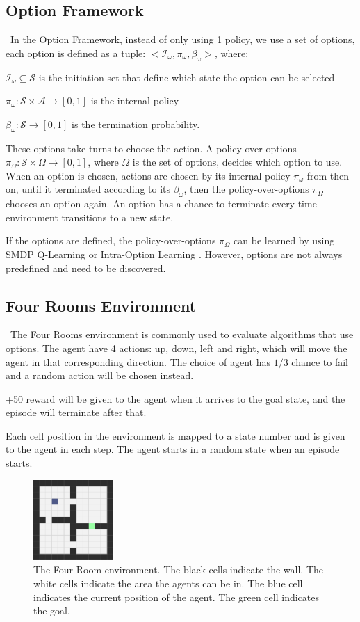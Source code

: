 \documentclass{article}
\begin{document}
	\subsection*{Option Framework}
	\qquad \ In the Option Framework\cite{SUTTON1999181}, instead of only using 1 policy, we use a set of options, each option is defined as a tuple: $<\mathcal{I}_\omega,\pi_\omega,\beta_\omega>$, where:
	
	\qquad $\mathcal{I}_\omega \subseteq \mathcal{S}$ is the initiation set that define which state the option can be selected
	
	\qquad $\pi_\omega : \mathcal{S} \times \mathcal{A} \rightarrow [0,1]$ is the internal policy
	
	\qquad $\beta_\omega:\mathcal{S} \rightarrow [0,1]$ is the termination probability.
	
	\quad These options take turns to choose the action. A policy-over-options $\pi_\Omega : \mathcal{S} \times \Omega \rightarrow [0,1]$, where $\Omega$ is the set of options, decides which option to use. When an option is chosen, actions are chosen by its internal policy $\pi_\omega$ from then on, until it terminated according to its $\beta_\omega$, then the policy-over-options $\pi_\Omega$ chooses an option again. An option has a chance to terminate every time environment transitions to a new state.
	
	\quad If the options are defined, the policy-over-options $\pi_\Omega$ can be learned by using SMDP Q-Learning \cite{smdp} or Intra-Option Learning \cite{intraoplearn}. However, options are not always predefined and need to be discovered.
	\subsection*{Four Rooms Environment}
	\qquad \ The Four Rooms environment is commonly used to evaluate algorithms that use options. The agent have 4 actions: up, down, left and right, which will move the agent in that corresponding direction. The choice of agent has $1/3$ chance to fail and a random action will be chosen instead.
	
	\quad +50 reward will be given to the agent when it arrives to the goal state, and the episode will terminate after that.
	
	\quad Each cell position in the environment is mapped to a state number and is given to the agent in each step. The agent starts in a random state when an episode starts.
	\begin{figure}[h]
		\centering
		\includegraphics[width=1.2in]{4Rooms.png}
		\caption{The Four Room environment. The black cells indicate the wall. The white cells indicate the area the agents can be in. The blue cell indicates the current position of the agent. The green cell indicates the goal.}
	\end{figure}
\end{document}

